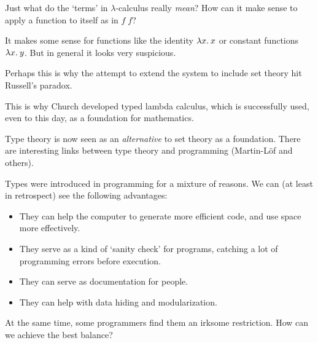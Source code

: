 \begin{slide*}


\vspace*{0.5cm}

Just what do the `terms' in $\lambda$-calculus really {\em mean}? How can it
make sense to apply a function to itself as in {\red $f\; f$}?

It makes some sense for functions like the identity {\red $\lambda x.\: x$}
or constant functions {\red $\lambda x.\: y$}. But in general it looks very
suspicious.

Perhaps this is why the attempt to extend the system to include set theory hit
Russell's paradox.

This is why Church developed typed lambda calculus, which is successfully used,
even to this day, as a foundation for mathematics.

Type theory is now seen as an {\em alternative} to set theory as a foundation.
There are interesting links between type theory and programming (Martin-L\"of
and others).

\end{slide*}




\begin{slide*}


\vspace*{0.5cm}

Types were introduced in programming for a mixture of reasons. We can (at least
in retrospect) see the following advantages:

\begin{itemize}

\item They can help the computer to generate more efficient code, and use space
more effectively.

\item They serve as a kind of `sanity check' for programs, catching a lot of
programming errors before execution.

\item They can serve as documentation for people.

\item They can help with data hiding and modularization.

\end{itemize}

At the same time, some programmers find them an irksome restriction. How can we
achieve the best balance?

\end{slide*}




